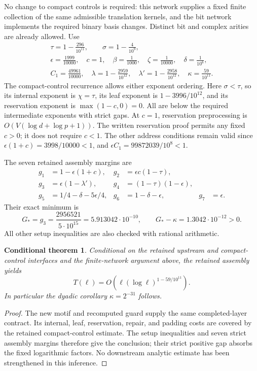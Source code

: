 \documentclass[11pt]{article}
\newtheorem{theorem}{Conditional theorem}
\begin{document}
No change to compact controls is required: this network supplies a fixed
finite collection of the same admissible translation kernels, and the bit
network implements the required binary basis changes. Distinct bit and
complex arities are already allowed. Use
\begin{gather*}
 \tau=1-\frac{296}{10^{11}},\qquad \sigma=1-\frac4{10^9},\\
 \epsilon=\frac{1999}{10000},\quad c=1,\quad
 \beta=\frac1{1000},\quad\zeta=\frac1{10000},\quad\delta=\frac1{10^6},\\
 C_1=\frac{49961}{10000},\quad
 \lambda=1-\frac{2959}{10^{12}},\quad
 \lambda'=1-\frac{2958}{10^{12}},\quad
 \kappa=\frac{59}{10^{11}}.
\end{gather*}
The compact-control recurrence allows either exponent ordering. Here
$\sigma<\tau$, so its internal exponent is $\chi=\tau$, its leaf exponent
is $1-3996/10^{12}$, and its reservation exponent is $\max(1-c,0)=0$.
All are below the required intermediate exponents with strict gaps.
At $c=1$, reservation preprocessing is $O(V(\log d+\log p+1))$.
The written reservation proof permits any fixed $c>0$; it does not require
$c<1$. The other address conditions remain valid since
$\epsilon(1+c)=3998/10000<1$, and
$\epsilon C_1=99872039/10^8<1$.

The seven retained assembly margins are
\begin{align*}
 g_1&=1-\epsilon(1+c),&g_2&=\epsilon c(1-\tau),\\
 g_3&=\epsilon(1-\lambda'),&g_4&=(1-\tau)(1-\epsilon),\\
 g_5&=1/4-\delta-5\epsilon/4,&g_6&=1-\delta-\epsilon,&g_7&=\epsilon.
\end{align*}
Their exact minimum is
\[
 G_*=g_3=\frac{2956521}{5\cdot10^{15}}=5.913042\cdot10^{-10},
 \qquad G_*-\kappa=1.3042\cdot10^{-12}>0.
\]
All other setup inequalities are also checked with rational arithmetic.

\begin{theorem}
Conditional on the retained upstream and compact-control interfaces and the
finite-network argument above, the retained assembly yields
\[
 T(\ell)=O\!\left(\ell(\log\ell)^{1-59/10^{11}}\right).
\]
In particular the dyadic corollary $\kappa=2^{-31}$ follows.
\end{theorem}
\begin{proof}
The new motif and recomputed guard supply the same completed-layer contract.
Its internal, leaf, reservation, repair, and padding costs are covered by the
retained compact-control estimate. The setup inequalities and seven strict
assembly margins therefore give the conclusion; their strict positive gap
absorbs the fixed logarithmic factors. No downstream analytic estimate has
been strengthened in this inference.
\end{proof}
\end{document}
